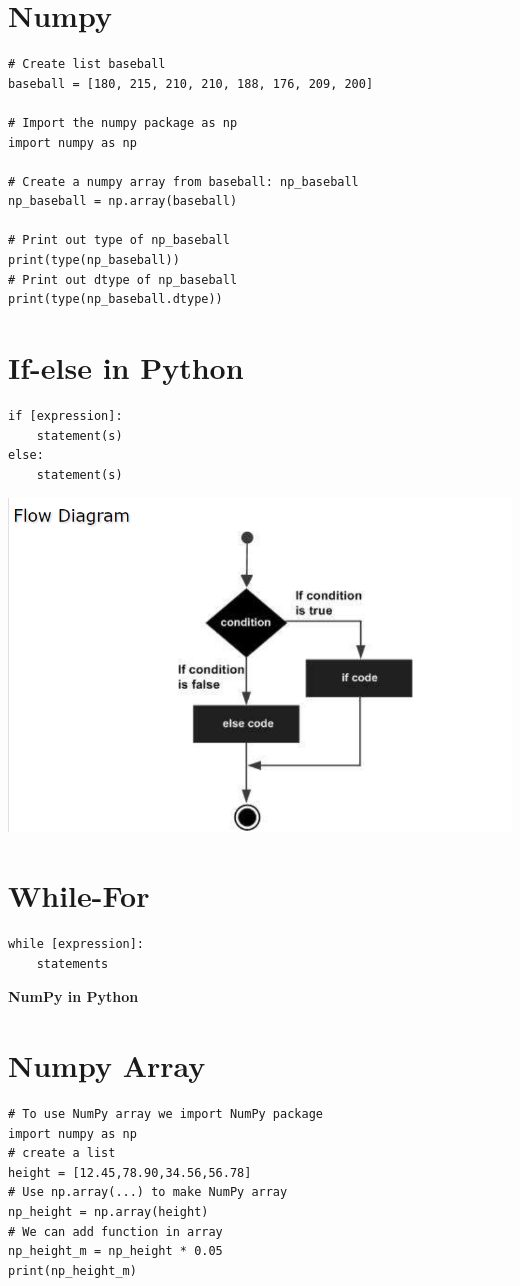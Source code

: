 \documentclass[12pt]{article}
\begin{document}
\section{Numpy}
\begin{lstlisting}
# Create list baseball
baseball = [180, 215, 210, 210, 188, 176, 209, 200]

# Import the numpy package as np
import numpy as np

# Create a numpy array from baseball: np_baseball
np_baseball = np.array(baseball)

# Print out type of np_baseball
print(type(np_baseball))
# Print out dtype of np_baseball
print(type(np_baseball.dtype))
\end{lstlisting}
\bigbreak
\section{If-else in Python}
\begin{lstlisting}
if [expression]:
	statement(s)
else:
	statement(s)
\end{lstlisting}
\bigbreak
\includegraphics{hinh1}
\section{While-For}
\begin{lstlisting}
while [expression]:
	statements
\end{lstlisting}

\pagebreak
\begin{center}
\textbf{NumPy in Python}
\end{center}
\section{Numpy Array}
\begin{lstlisting}
# To use NumPy array we import NumPy package
import numpy as np
# create a list
height = [12.45,78.90,34.56,56.78]
# Use np.array(...) to make NumPy array
np_height = np.array(height)
# We can add function in array
np_height_m = np_height * 0.05
print(np_height_m)
\end{lstlisting}
\end{document}
